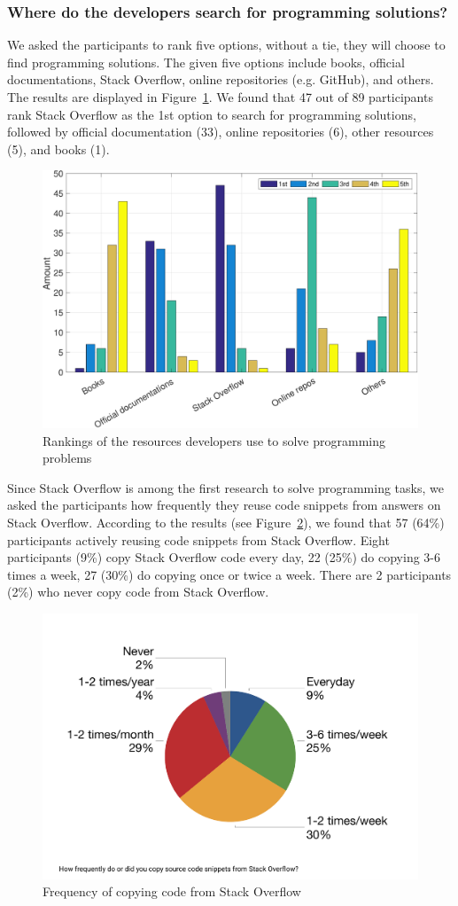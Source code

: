 \documentclass{svjour3}                     %
\begin{document}
\subsubsection*{Where do the developers search for programming solutions?}

We asked the participants to rank five options, without a tie, they will choose
to find programming solutions. The given five options include books, official
documentations, Stack Overflow, online repositories (e.g. GitHub), and others.
The results are displayed in Figure~\ref{fig:survey_visitor_rankings-crop}. We
found that 47 out of 89 participants rank Stack Overflow as the 1st option to
search for programming solutions, followed by official documentation (33),
online repositories (6), other resources (5), and books (1).

\begin{figure} \centering
	\includegraphics[width=.5\linewidth]{survey_visitor_rankings-crop} 
	\caption{Rankings of the resources developers use to solve programming problems}
	\label{fig:survey_visitor_rankings-crop} 
\end{figure}

Since Stack Overflow is among the first research to solve programming tasks, we
asked the participants how frequently they reuse code snippets from answers on
Stack Overflow. According to the results (see
Figure~\ref{fig:survey_visitor_frequency_so_copy-crop}), we found that 57 (64\%)
participants actively reusing code snippets from Stack Overflow. Eight
participants (9\%) copy Stack Overflow code every day, 22 (25\%) do copying 3-6
times a week, 27 (30\%) do copying once or twice a week. There are 2
participants (2\%) who never copy code from Stack Overflow.

\begin{figure} \centering
	\includegraphics[width=.5\linewidth]{survey_visitor_frequency_so_copy} 
	\caption{Frequency of copying code from Stack Overflow}
	\label{fig:survey_visitor_frequency_so_copy-crop} 
\end{figure}
\end{document}

